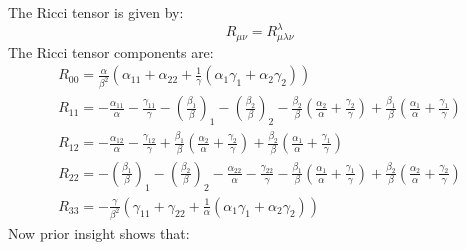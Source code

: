 \documentclass{article}
\begin{document}
The Ricci tensor is given by:
\begin{equation}
R_{\mu\nu}=R_{\mu\lambda\nu}^{\lambda}
\end{equation}
The Ricci tensor components are:
\begin{equation}
\begin{array}{l}
R_{00}=\frac{\alpha}{\beta^{2}}\left(\alpha_{11}+\alpha_{22}+\frac{1}{\gamma}\left(\alpha_{1}\gamma_{1}+\alpha_{2}\gamma_{2}\right)\right)\\
R_{11}=-\frac{\alpha_{11}}{\alpha}-\frac{\gamma_{11}}{\gamma}-\left(\frac{\beta_{1}}{\beta}\right)_{1}-\left(\frac{\beta_{2}}{\beta}\right)_{2}-\frac{\beta_{2}}{\beta}\left(\frac{\alpha_{2}}{\alpha}+\frac{\gamma_{2}}{\gamma}\right)+\frac{\beta_{1}}{\beta}\left(\frac{\alpha_{1}}{\alpha}+\frac{\gamma_{1}}{\gamma}\right)\\
R_{12}=-\frac{\alpha_{12}}{\alpha}-\frac{\gamma_{12}}{\gamma}+\frac{\beta_{1}}{\beta}\left(\frac{\alpha_{2}}{\alpha}+\frac{\gamma_{2}}{\gamma}\right)+\frac{\beta_{2}}{\beta}\left(\frac{\alpha_{1}}{\alpha}+\frac{\gamma_{1}}{\gamma}\right)\\
R_{22}=-\left(\frac{\beta_{1}}{\beta}\right)_{1}-\left(\frac{\beta_{2}}{\beta}\right)_{2}-\frac{\alpha_{22}}{\alpha}-\frac{\gamma_{22}}{\gamma}-\frac{\beta_{1}}{\beta}\left(\frac{\alpha_{1}}{\alpha}+\frac{\gamma_{1}}{\gamma}\right)+\frac{\beta_{2}}{\beta}\left(\frac{\alpha_{2}}{\alpha}+\frac{\gamma_{2}}{\gamma}\right)\\
R_{33}=-\frac{\gamma}{\beta^{2}}\left(\gamma_{11}+\gamma_{22}+\frac{1}{\alpha}\left(\alpha_{1}\gamma_{1}+\alpha_{2}\gamma_{2}\right)\right)
\end{array}
\end{equation}
Now prior insight shows that:
\end{document}

